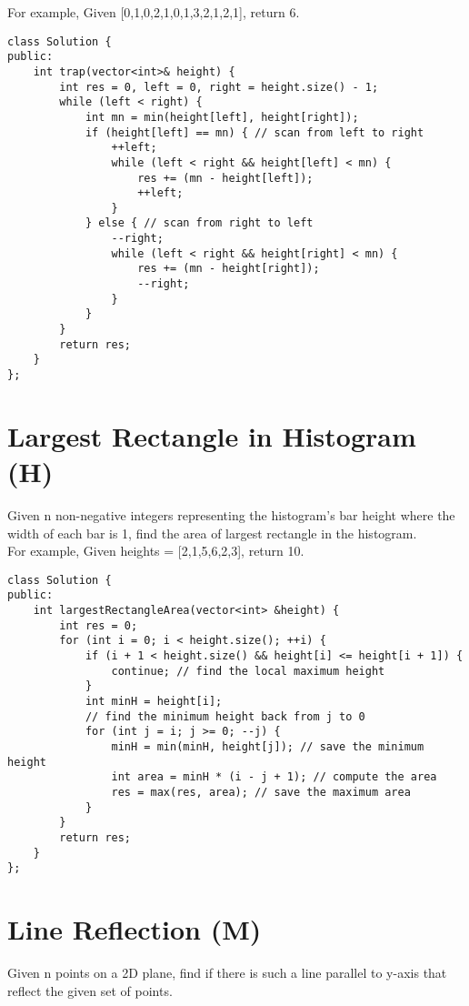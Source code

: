 For example, Given [0,1,0,2,1,0,1,3,2,1,2,1], return 6. \\

\begin{lstlisting}
class Solution {
public:
    int trap(vector<int>& height) {
        int res = 0, left = 0, right = height.size() - 1;
        while (left < right) {
            int mn = min(height[left], height[right]);
            if (height[left] == mn) { // scan from left to right
                ++left;
                while (left < right && height[left] < mn) {
                    res += (mn - height[left]);
                    ++left;
                }
            } else { // scan from right to left
                --right;
                while (left < right && height[right] < mn) {
                    res += (mn - height[right]);
                    --right;
                }
            }
        }
        return res;
    }
};
\end{lstlisting}


\section{Largest Rectangle in Histogram (H)}
Given n non-negative integers representing the histogram's bar height where the width of each bar is 1, find the area of largest rectangle in the histogram. \\

For example,
Given heights = [2,1,5,6,2,3],
return 10. \\

\begin{lstlisting}
class Solution {
public:
    int largestRectangleArea(vector<int> &height) {
        int res = 0;
        for (int i = 0; i < height.size(); ++i) {
            if (i + 1 < height.size() && height[i] <= height[i + 1]) {
                continue; // find the local maximum height
            }
            int minH = height[i];
            // find the minimum height back from j to 0
            for (int j = i; j >= 0; --j) { 
                minH = min(minH, height[j]); // save the minimum height
                int area = minH * (i - j + 1); // compute the area
                res = max(res, area); // save the maximum area
            }
        }
        return res;
    }
};
\end{lstlisting}


\section{Line Reflection (M)}
Given n points on a 2D plane, find if there is such a line parallel to y-axis that reflect the given set of points.\\

